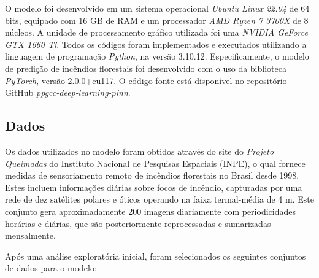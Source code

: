 \documentclass[journal]{IEEEtran}
\begin{document}
O modelo foi desenvolvido em um sistema operacional \textit{Ubuntu Linux 22.04} de 64 bits, equipado com 16 GB de RAM e um processador \textit{AMD Ryzen 7 3700X} de 8 núcleos. A unidade de processamento gráfico utilizada foi uma \textit{NVIDIA GeForce GTX 1660 Ti}. Todos os códigos foram implementados e executados utilizando a linguagem de programação \textit{Python}, na versão 3.10.12. Especificamente, o modelo de predição de incêndios florestais foi desenvolvido com o uso da biblioteca \textit{PyTorch}, versão 2.0.0+cu117. O código fonte está disponível no repositório GitHub \textit{ppgcc-deep-learning-pinn}\cite{ppgcc_deep_learning_pinn_2023}.

\subsection{Dados}

Os dados utilizados no modelo foram obtidos através do site do \textit{Projeto Queimadas} do Instituto Nacional de Pesquisas Espaciais (INPE)\cite{terra_brasilis_dataset}, o qual fornece medidas de sensoriamento remoto de incêndios florestais no Brasil desde 1998. Estes incluem informações diárias sobre focos de incêndio, capturadas por uma rede de dez satélites polares e óticos operando na faixa termal-média de 4 \textmu m. Este conjunto gera aproximadamente 200 imagens diariamente com periodicidades horárias e diárias, que são posteriormente reprocessadas e sumarizadas mensalmente.\newline

Após uma análise exploratória inicial, foram selecionados os seguintes conjuntos de dados para o modelo:
\end{document}
